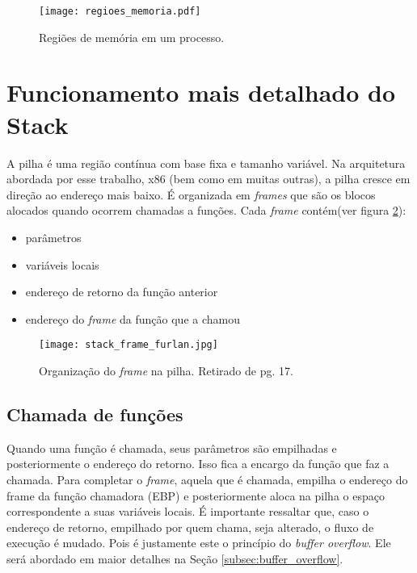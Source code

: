 	\begin{figure}
		\begin{center}
		\texttt{[image: regioes\_memoria.pdf]}
		\caption{Regiões de memória em um processo.}
		\label{fig:regioes_memoria}
		\end{center}
	\end{figure}

	\section{Funcionamento mais detalhado do Stack}
	A pilha é uma região contínua com base fixa e tamanho variável.
	Na arquitetura abordada por esse trabalho, x86 (bem como em muitas outras), a pilha cresce
	em direção ao endereço mais baixo. É organizada em \textsl{frames} que são os blocos
	alocados quando ocorrem chamadas a funções. Cada \textsl{frame} contém(ver figura \ref{fig:stack_frame}):
	\begin{itemize}
		\item parâmetros
		\item variáveis locais
		\item endereço de retorno da função anterior
		\item endereço do \textsl{frame} da função que a chamou
	\end{itemize}

	\begin{figure}
		\begin{center}
		\texttt{[image: stack\_frame\_furlan.jpg]}
		\caption{Organização do \textsl{frame} na pilha. Retirado de \cite{Furlan2005} pg. 17.}
		\label{fig:stack_frame}
		\end{center}
	\end{figure}

	\subsection{Chamada de funções}
	Quando uma função é chamada, seus parâmetros são empilhadas e posteriormente o endereço
	do retorno. Isso fica a encargo da função que faz a chamada.
	Para completar o \textsl{frame}, aquela que é chamada, empilha o endereço do frame da função chamadora
	(EBP) e posteriormente aloca na pilha o espaço correspondente a suas variáveis locais.
	É importante ressaltar que, caso o endereço de retorno, empilhado por quem chama, seja alterado,
	o fluxo de execução é mudado. Pois é justamente este o princípio do \textsl{buffer overflow}.
	Ele será abordado em maior detalhes na Seção \ref{subsec:buffer_overflow}.

